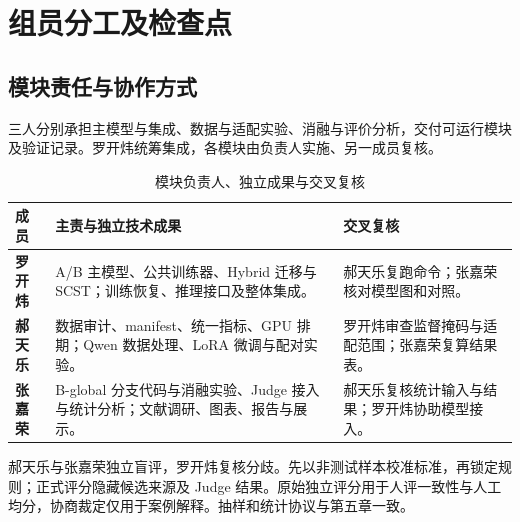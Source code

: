 \section{组员分工及检查点}
\label{sec:team}
\subsection{模块责任与协作方式}
三人分别承担主模型与集成、数据与适配实验、消融与评价分析，交付可运行模块及验证记录。罗开炜统筹集成，各模块由负责人实施、另一成员复核。

\begin{table}[!ht]
\caption{模块负责人、独立成果与交叉复核}
\label{tab:member-roles}\centering\small
\setlength{\tabcolsep}{4pt}\renewcommand{\arraystretch}{1.13}
\begin{tabularx}{\linewidth}{@{}P{1.35cm}YP{4.35cm}@{}}\toprule
{}\textbf{成员} & \textbf{主责与独立技术成果} & \textbf{交叉复核}\\\midrule
\textbf{\color{FLBlue}罗开炜} & A/B 主模型、公共训练器、Hybrid 迁移与 SCST；训练恢复、推理接口及整体集成。 & 郝天乐复跑命令；张嘉荣核对模型图和对照。\\\addlinespace
\textbf{\color{FLTeal}郝天乐} & 数据审计、manifest、统一指标、GPU 排期；Qwen 数据处理、LoRA 微调与配对实验。 & 罗开炜审查监督掩码与适配范围；张嘉荣复算结果表。\\\addlinespace
\textbf{\color{FLAmber}张嘉荣} & B-global 分支代码与消融实验、Judge 接入与统计分析；文献调研、图表、报告与展示。 & 郝天乐复核统计输入与结果；罗开炜协助模型接入。\\\bottomrule
\end{tabularx}
\end{table}

郝天乐与张嘉荣独立盲评，罗开炜复核分歧。先以非测试样本校准标准，再锁定规则；正式评分隐藏候选来源及 Judge 结果。原始独立评分用于人评一致性与人工均分，协商裁定仅用于案例解释。抽样和统计协议与第五章一致。

